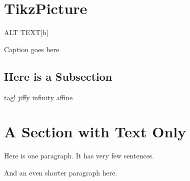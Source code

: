 \documentclass{article}
\begin{document}
\tableofcontents

\newpage

\section{TikzPicture}




\begin{accfigure}{ALT TEXT}[h]
    
    \caption{Caption goes here}
\end{accfigure}

\subsection{Here is a Subsection}

tag! jiffy infinity affine
\tagmcend

\section{A Section with Text Only}

Here is one paragraph. It has very few sentences.
\CloseMc{}

And an even shorter paragraph here.
\CloseMc
\end{document}
